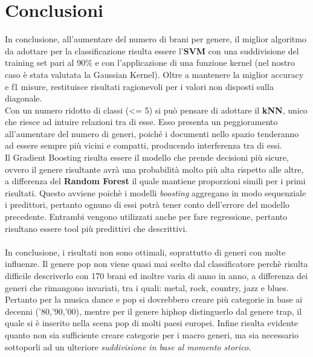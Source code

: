 \documentclass[%
 reprint,
 amsmath,amssymb,
 aps,
 article,
]{revtex4-1}
\begin{document}
\section{\label{sec:level1}Conclusioni}
In conclusione, all'aumentare del numero di brani per genere, il miglior algoritmo da adottare per la classificazione risulta essere l'\textbf{SVM} con una suddivisione del training set pari al 90\% e con l'applicazione di una funzione kernel (nel nostro caso è stata valutata la Gaussian Kernel). Oltre a mantenere la miglior accuracy e f1 misure, restituisce risultati ragionevoli per i valori non disposti sulla diagonale. \\
Con un numero ridotto di classi (\textless= 5) si può pensare di adottare il \textbf{kNN}, unico che riesce ad intuire relazioni tra di esse. Esso presenta un peggioramento all'aumentare del numero di generi, poiché i documenti nello spazio tenderanno ad essere sempre più vicini e compatti, producendo interferenza tra di essi.\\ 
Il Gradient Boosting risulta essere il modello che prende decisioni più sicure, ovvero il genere risultante avrà una probabilità molto più alta rispetto alle altre, a differenza del  \textbf{Random Forest} il quale mantiene proporzioni simili per i primi risultati. Questo avviene poichè i modelli \textit{boosting} aggregano in modo sequenziale i predittori, pertanto ognuno di essi potrà tener conto dell'errore del modello precedente. Entrambi vengono utilizzati anche per fare regressione, pertanto risultano essere tool più predittivi che descrittivi.\\\\

In conclusione, i risultati non sono ottimali, soprattutto di generi con molte influenze. Il genere pop non viene quasi mai scelto dal classificatore perchè risulta difficile descriverlo con 170 brani ed inoltre varia di anno in anno, a differenza dei generi che rimangono invariati, tra i quali: metal, rock, country, jazz e blues. Pertanto per la musica dance e pop si dovrebbero creare più categorie in base ai decenni ('80,'90,'00), mentre per il genere hiphop distinguerlo dal genere trap, il quale si è inserito nella scena pop di molti paesi europei. Infine risulta evidente quanto non sia sufficiente creare categorie per i macro generi, ma sia necessario sottoporli ad un ulteriore \textit{suddivisione in base al momento storico}.
\end{document}
